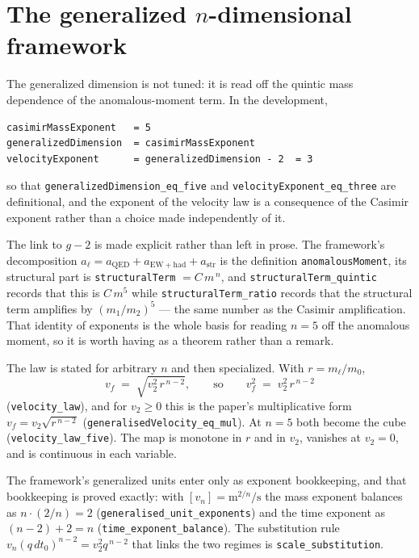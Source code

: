 \documentclass[11pt,a4paper]{article}
\begin{document}
\section{The generalized $n$-dimensional framework}
\label{sec:dimensions}

The generalized dimension is not tuned: it is read off the quintic mass
dependence of the anomalous-moment term.  In the development,

\begin{verbatim}
casimirMassExponent   = 5
generalizedDimension  = casimirMassExponent
velocityExponent      = generalizedDimension - 2  = 3
\end{verbatim}

\noindent so that \texttt{generalizedDimension\_eq\_five} and
\texttt{velocityExponent\_eq\_three} are definitional, and the exponent of the
velocity law is a consequence of the Casimir exponent rather than a choice made
independently of it.

The link to $g-2$ is made explicit rather than left in prose.  The framework's
decomposition $a_\ell = a_{\mathrm{QED}} + a_{\mathrm{EW+had}} + a_{\mathrm{str}}$
is the definition \texttt{anomalousMoment}, its structural part is
\texttt{structuralTerm} $= C\,m^{\,n}$, and \texttt{structuralTerm\_quintic}
records that this is $C\,m^5$ while
\texttt{structuralTerm\_ratio} records that the structural term amplifies by
$(m_1/m_2)^5$ --- the same number as the Casimir amplification.  That identity of
exponents is the whole basis for reading $n = 5$ off the anomalous moment, so it
is worth having as a theorem rather than a remark.

The law is stated for arbitrary $n$ and then specialized.  With $r = m_\ell/m_0$,
\[
  v_f \;=\; \sqrt{v_2^2\, r^{\,n-2}},
  \qquad\text{so}\qquad
  v_f^2 \;=\; v_2^2\, r^{\,n-2}
\]
(\texttt{velocity\_law}), and for $v_2 \ge 0$ this is the paper's multiplicative
form $v_f = v_2\sqrt{r^{\,n-2}}$ (\texttt{generalisedVelocity\_eq\_mul}).  At
$n = 5$ both become the cube (\texttt{velocity\_law\_five}).  The map is
monotone in $r$ and in $v_2$, vanishes at $v_2 = 0$, and is continuous in each
variable.

The framework's generalized units enter only as exponent bookkeeping, and that
bookkeeping is proved exactly: with $[v_n] = \mathrm{m}^{2/n}/\mathrm{s}$ the mass
exponent balances as $n \cdot (2/n) = 2$
(\texttt{generalised\_unit\_exponents}) and the time exponent as
$(n-2)+2 = n$ (\texttt{time\_exponent\_balance}).  The substitution rule
$v_n (q\,dt_0)^{n-2} = v_2^2 q^{\,n-2}$ that links the two regimes is
\texttt{scale\_substitution}.
\end{document}
